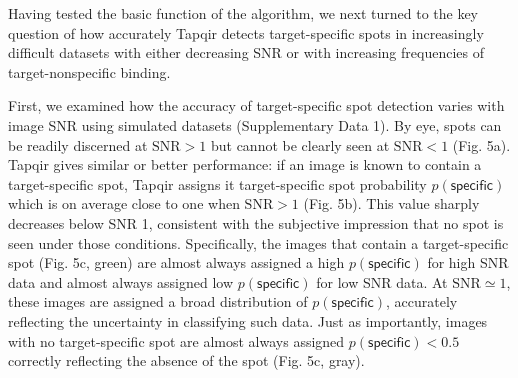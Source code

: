 Having tested the basic function of the algorithm, we next turned to the key question of how accurately Tapqir detects target-specific spots in increasingly difficult datasets with either decreasing SNR or with increasing frequencies of target-nonspecific binding.  

First, we examined how the accuracy of target-specific spot detection varies with  image SNR using simulated datasets (Supplementary Data 1). By eye, spots can be readily discerned at $\mathrm{SNR}>1$ but cannot be clearly seen at $\mathrm{SNR}<1$ (Fig. 5a). Tapqir gives similar or better performance:  if an image is known to contain a target-specific spot, Tapqir assigns it target-specific spot probability $p(\mathsf{specific})$ which is on average close to  one when $\mathrm{SNR}>1$ (Fig. 5b).  This value sharply decreases below SNR 1, consistent with the subjective impression that no spot is seen under those conditions.  Specifically, the images that contain a target-specific spot (Fig. 5c, green) are almost always assigned a high $p(\mathsf{specific})$ for high SNR data and almost always assigned low $p(\mathsf{specific})$ for low SNR data.  At $\mathrm{SNR} \simeq 1$, these images are assigned a broad distribution of $p(\mathsf{specific})$, accurately reflecting the uncertainty in classifying such data.  Just as importantly, images with no target-specific spot are almost always assigned $p(\mathsf{specific}) < 0.5$ correctly reflecting the absence of the spot (Fig. 5c, gray).

